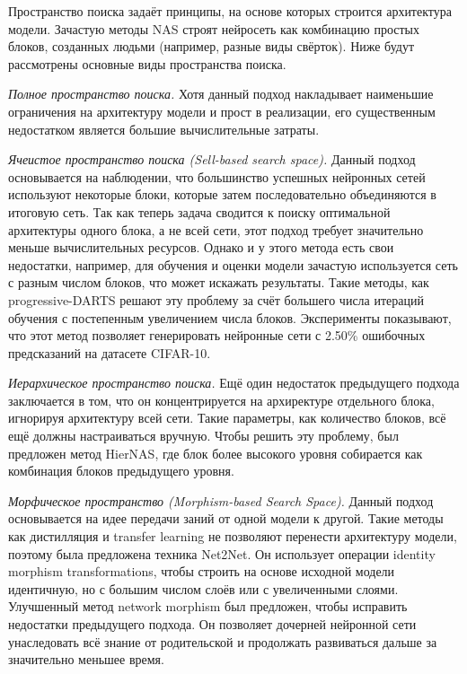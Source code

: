 \documentclass[a4paper,14pt]{extarticle}
\begin{document}
    Пространство поиска задаёт принципы, на основе которых строится архитектура модели.
    Зачастую методы NAS строят нейросеть как комбинацию простых блоков, созданных людьми (например, разные виды свёрток).
    Ниже будут рассмотрены основные виды пространства поиска.

    \emph{Полное пространство поиска.}
    Хотя данный подход накладывает наименьшие ограничения на архитектуру модели и прост в реализации, его существенным недостатком является большие вычислительные затраты.

    \emph{Ячеистое пространство поиска (Sell-based search space).}
    Данный подход основывается на наблюдении, что большинство успешных нейронных сетей используют некоторые блоки, которые затем последовательно объединяются в итоговую сеть.
    Так как теперь задача сводится к поиску оптимальной архитектуры одного блока, а не всей сети, этот подход требует значительно меньше вычислительных ресурсов.
    Однако и у этого метода есть свои недостатки, например, для обучения и оценки модели зачастую используется сеть с разным числом блоков, что может искажать результаты.
    Такие методы, как progressive-DARTS решают эту проблему за счёт большего числа итераций обучения с постепенным увеличением числа блоков.
    Эксперименты показывают, что этот метод позволяет генерировать нейронные сети с 2.50\% ошибочных предсказаний на датасете CIFAR-10.

    \emph{Иерархическое пространство поиска.}
    Ещё один недостаток предыдущего подхода заключается в том, что он концентрируется на архиректуре отдельного блока, игнорируя архитектуру всей сети.
    Такие параметры, как количество блоков, всё ещё должны настраиваться вручную.
    Чтобы решить эту проблему, был предложен метод HierNAS, где блок более высокого уровня собирается как комбинация блоков предыдущего уровня.

    \emph{Морфическое пространство (Morphism-based Search Space).}
    Данный подход основывается на идее передачи заний от одной модели к другой.
    Такие методы как дистилляция и transfer learning не позволяют перенести архитектуру модели, поэтому была предложена техника Net2Net.
    Он использует операции identity morphism transformations, чтобы строить на основе исходной модели идентичную, но с большим числом слоёв или с увеличенными слоями.
    Улучшенный метод network morphism \cite{bibl:morphism} был предложен, чтобы исправить недостатки предыдущего подхода.
    Он позволяет дочерней нейронной сети унаследовать всё знание от родительской и продолжать развиваться дальше за значительно меньшее время.
\end{document}

